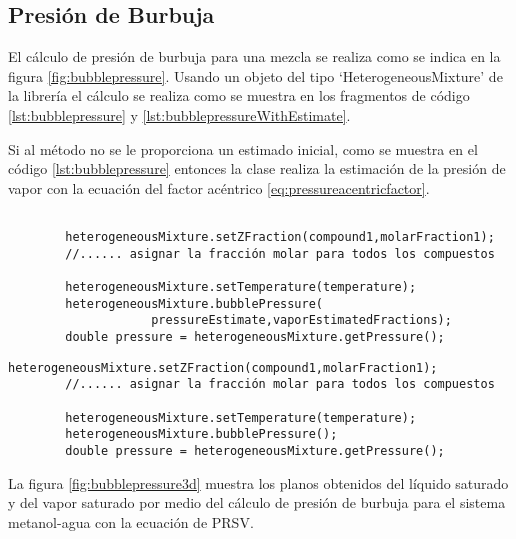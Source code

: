 \subsection{Presión de Burbuja}\label{subsec:bubblepressure}

	El cálculo de presión de burbuja para una mezcla se realiza como se indica en la figura \ref{fig:bubblepressure}. Usando un objeto del tipo `HeterogeneousMixture' de la librería \Materia el cálculo se realiza como se muestra en los fragmentos de código \ref{lst:bubblepressure} y \ref{lst:bubblepressureWithEstimate}.

	Si al método no se le proporciona un estimado inicial, como se muestra en el código \ref{lst:bubblepressure} entonces la clase realiza la estimación de la presión de vapor con la ecuación del factor acéntrico \ref{eq:pressureacentricfactor}. 



	\begin{lstlisting}[label={lst:bubblepressureWithEstimate},caption={Cálculo de la presión de burbuja proporcionando un estimado inicial.}]

		heterogeneousMixture.setZFraction(compound1,molarFraction1);
		//...... asignar la fracción molar para todos los compuestos

		heterogeneousMixture.setTemperature(temperature);
		heterogeneousMixture.bubblePressure(
					pressureEstimate,vaporEstimatedFractions);
		double pressure = heterogeneousMixture.getPressure();
	\end{lstlisting}


	\begin{lstlisting}[label={lst:bubblepressure},caption={Cálculo de la presión de burbuja.}]
		heterogeneousMixture.setZFraction(compound1,molarFraction1);
		//...... asignar la fracción molar para todos los compuestos

		heterogeneousMixture.setTemperature(temperature);
		heterogeneousMixture.bubblePressure();
		double pressure = heterogeneousMixture.getPressure();
	\end{lstlisting}

	La figura \ref{fig:bubblepressure3d} muestra los planos obtenidos del líquido saturado y del vapor saturado por medio del cálculo de presión de burbuja para el sistema metanol-agua con la ecuación de PRSV.

